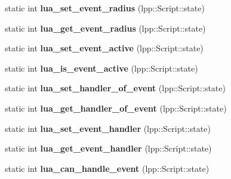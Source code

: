 \begin{DoxyCompactItemize}
\item 
static int {\bfseries lua\+\_\+set\+\_\+event\+\_\+radius} (lpp\+::\+Script\+::state)\hypertarget{class_lua_interface_a76dc4ba80fe69d6b2fd0dac83adcf447}{}\label{class_lua_interface_a76dc4ba80fe69d6b2fd0dac83adcf447}

\item 
static int {\bfseries lua\+\_\+get\+\_\+event\+\_\+radius} (lpp\+::\+Script\+::state)\hypertarget{class_lua_interface_a21471660024742c779915145d72190e7}{}\label{class_lua_interface_a21471660024742c779915145d72190e7}

\item 
static int {\bfseries lua\+\_\+set\+\_\+event\+\_\+active} (lpp\+::\+Script\+::state)\hypertarget{class_lua_interface_ab2f6ae631d7816670f80de79a2d61961}{}\label{class_lua_interface_ab2f6ae631d7816670f80de79a2d61961}

\item 
static int {\bfseries lua\+\_\+is\+\_\+event\+\_\+active} (lpp\+::\+Script\+::state)\hypertarget{class_lua_interface_a2bac0f6397866257bf8ba997c31235b3}{}\label{class_lua_interface_a2bac0f6397866257bf8ba997c31235b3}

\item 
static int {\bfseries lua\+\_\+set\+\_\+handler\+\_\+of\+\_\+event} (lpp\+::\+Script\+::state)\hypertarget{class_lua_interface_ad59c80d46879535b6741a9cebe835bcf}{}\label{class_lua_interface_ad59c80d46879535b6741a9cebe835bcf}

\item 
static int {\bfseries lua\+\_\+get\+\_\+handler\+\_\+of\+\_\+event} (lpp\+::\+Script\+::state)\hypertarget{class_lua_interface_a0d77c6d5d2482d476791285e2be43989}{}\label{class_lua_interface_a0d77c6d5d2482d476791285e2be43989}

\item 
static int {\bfseries lua\+\_\+set\+\_\+event\+\_\+handler} (lpp\+::\+Script\+::state)\hypertarget{class_lua_interface_ac3816c41e63b3b6f174e2bfe4eea00e4}{}\label{class_lua_interface_ac3816c41e63b3b6f174e2bfe4eea00e4}

\item 
static int {\bfseries lua\+\_\+get\+\_\+event\+\_\+handler} (lpp\+::\+Script\+::state)\hypertarget{class_lua_interface_a878bd4c78f7c9752498e1a9a3ab6539d}{}\label{class_lua_interface_a878bd4c78f7c9752498e1a9a3ab6539d}

\item 
static int {\bfseries lua\+\_\+can\+\_\+handle\+\_\+event} (lpp\+::\+Script\+::state)\hypertarget{class_lua_interface_ae92ae75bebf9d00e00addc8c99607d84}{}\label{class_lua_interface_ae92ae75bebf9d00e00addc8c99607d84}


\end{DoxyCompactItemize}
